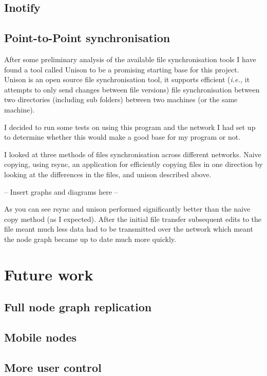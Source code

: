 \documentclass[12pt]{article}
\begin{document}
\subsection{Inotify}

\subsection{Point-to-Point synchronisation}
After some preliminary analysis of the available file synchronisation
tools I have found a tool called Unison to be a promising starting
base for this project. Unison is an open source file synchronisation tool,
it supports efficient (\emph{i.e.,} it attempts to only send changes between file versions) file synchronisation between two
directories (including sub folders) between two machines (or the same
machine).

I decided to run some tests on using this program and the network
I had set up to determine whether this would make a good base for
my program or not.

I looked at three methods of files synchronisation across
different networks. Naive copying, using rsync, an application
for efficiently copying files in one direction by looking at
the differences in the files, and unison described above.

-- Insert graphs and diagrams here --

As you can see rsync and unison performed significantly better
than the naive copy method (as I expected). After the initial file
transfer subsequent edits to the file meant much less data had to
be transmitted over the network which meant the node graph
became up to date much more quickly.

\section{Future work}
\subsection{Full node graph replication}

\subsection{Mobile nodes}

\subsection{More user control}
\end{document}

